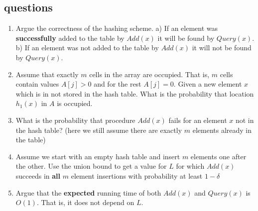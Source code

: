 \documentclass{article}
\begin{document}
\subsection*{questions}
\begin{enumerate}
\item Argue the correctness of the hashing scheme. 
a) If an element was {\bf successfully} added to the table by $Add(x)$ it will be found by $Query(x)$. 
b) If an element was not added to the table by $Add(x)$ it will not be found by $Query(x)$. 
\item Assume that exactly $m$ cells in the array are occupied. That is, $m$ cells contain values $A[j] > 0$ and for the rest $A[j]=0$.
Given a new element $x$ which is in not stored in the hash table. What is the probability that location $h_1(x)$ in $A$ is occupied.
\item What is the probability that procedure $Add(x)$ fails for an element $x$ not in the hash table? (here we still assume there are exactly $m$ elements already in the table)
\item Assume we start with an empty hash table and insert $m$ elements one after the other. 
Use the union bound to get a value for $L$ for which $Add(x)$ succeeds in {\bf all} $m$ element insertions with probability at least $1-\delta$
\item Argue that the {\bf expected} running time of both $Add(x)$ and $Query(x)$ is $O(1)$. That is, it does not depend on $L$. 
\end{enumerate}


\end{document}
